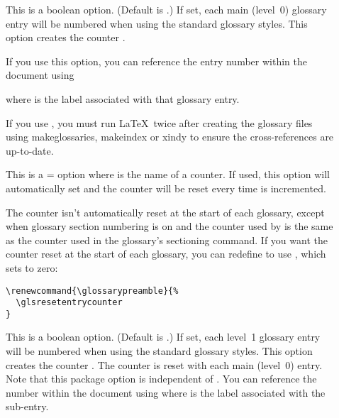 \documentclass[report]{nlctdoc}
\renewcommand*{\glossarypreamble}{%
\emph{This glossary style was setup using:}
\begin{ttfamily}
\begin{tabbing}
\cs{usepackage}[\=xindy,\\
\+\>nonumberlist,\\
  seeautonumberlist,\\
  toc,\\
  style=altlist]\{glossaries\}
\end{tabbing}
\cs{renewcommand*}\{\ics{glsgroupskip}\}\{\}\newline
\cs{renewcommand*}\{\ics{glsseeformat}\}[3][\ics{seename}]\{\% \newline
(\ics{xmakefirstuc}\{\#1\} \ics{glsseelist}\{\#2\}.)\}
\end{ttfamily}
}
\begin{document}
\begin{description}
\item[] This is a boolean option. (Default
is .) If set, each main (level~0)
glossary entry will be numbered when using the standard glossary
styles. This option creates the counter
.

If you use this option, you can reference the entry number
within the document using
\begin{definition}[\DescribeMacro{\glsrefentry}]
\end{definition}
where  is the label associated with that glossary entry.

\begin{important}
If you use , you must run \LaTeX\ twice after
creating the glossary files using \gls{makeglossaries},
\gls{makeindex} or \gls{xindy} to ensure the cross-references are
up-to-date.
\end{important}

\item[] This is a =
option where  is the name of a counter. If used, this
option will automatically set  and the
 counter will be reset every time  is
incremented.

\DescribeMacro{\glsresetentrycounter}
\begin{important}
The  counter isn't automatically reset at the
start of each glossary, except when glossary section numbering is on
and the counter used by  is the same as the
counter used in the glossary's sectioning command. If you want the
counter reset at the start of each glossary, you can redefine
 to use , which sets
 to zero:
\begin{verbatim}
\renewcommand{\glossarypreamble}{%
  \glsresetentrycounter
}
\end{verbatim}
\end{important}

\item[] This is a boolean option. (Default
is .) If set, each level~1
glossary entry will be numbered when using the standard glossary
styles. This option creates the counter
.
The counter is reset with each main (level~0) entry. Note that this
package option is independent of . You can
reference the number within the document using
 where  is the label
associated with the sub-entry.


\end{description}
\end{document}

